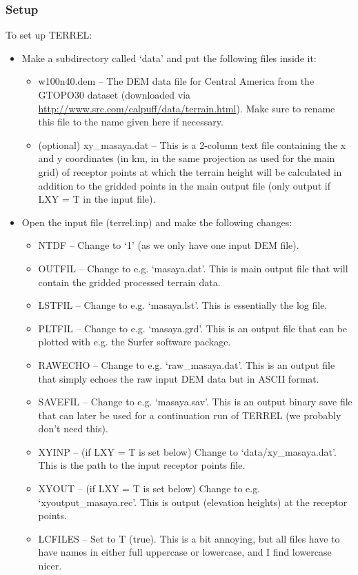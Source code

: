 \documentclass[10pt,a4paper]{article}
\begin{document}
\subsubsection{Setup}
To set up TERREL:
\begin{itemize}
\item Make a subdirectory called `data' and put the following files inside it:
\begin{itemize}
\item w100n40.dem -- The DEM data file for Central America from the GTOPO30 dataset (downloaded via \url{http://www.src.com/calpuff/data/terrain.html}). Make sure to rename this file to the name given here if necessary.
\item (optional) xy\_masaya.dat -- This is a 2-column text file containing the x and y coordinates (in km, in the same projection as used for the main grid) of receptor points at which the terrain height will be calculated in addition to the gridded points in the main output file (only output if LXY = T in the input file).
\end{itemize}
\item Open the input file (terrel.inp) and make the following changes:
\begin{itemize}
\item NTDF -- Change to `1' (as we only have one input DEM file).
\item OUTFIL -- Change to e.g. `masaya.dat'. This is main output file that will contain the gridded processed terrain data.
\item LSTFIL -- Change to e.g. `masaya.lst'. This is essentially the log file.
\item PLTFIL -- Change to e.g. `masaya.grd'. This is an output file that can be plotted with e.g. the Surfer software package.
\item RAWECHO -- Change to e.g. `raw\_masaya.dat'. This is an output file that simply echoes the raw input DEM data but in ASCII format.
\item SAVEFIL -- Change to e.g. `masaya.sav'. This is an output binary save file that can later be used for a continuation run of TERREL (we probably don't need this).
\item XYINP -- (if LXY = T is set below) Change to `data/xy\_masaya.dat'. This is the path to the input receptor points file.
\item XYOUT -- (if LXY = T is set below) Change to e.g. `xyoutput\_masaya.rec'. This is output (elevation heights) at the receptor points.
\item LCFILES -- Set to T (true). This is a bit annoying, but all files have to have names in either full uppercase or lowercase, and I find lowercase nicer.

\end{itemize}
\end{itemize}
\end{document}
